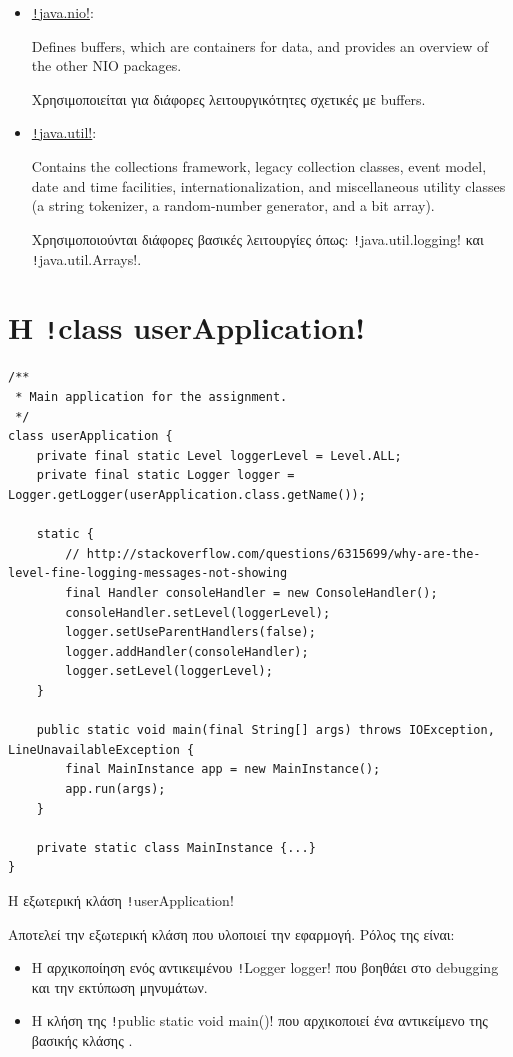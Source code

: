 \begin{itemize}
\item
\href{https://docs.oracle.com/javase/8/docs/api/java/nio/package-summary.html}{\texttt!java.nio!}:
\begin{displayquote}
Defines buffers, which are containers for data, and provides an overview of the other NIO packages.
\end{displayquote}
Χρησιμοποιείται για διάφορες λειτουργικότητες σχετικές με buffers.

\item
\href{https://docs.oracle.com/javase/8/docs/api/java/util/package-summary.html}{\texttt!java.util!}:
\begin{displayquote}
Contains the collections framework, legacy collection classes, event model, date and time facilities, internationalization, and miscellaneous utility classes (a string tokenizer, a random-number generator, and a bit array).
\end{displayquote}
\sloppy Χρησιμοποιούνται διάφορες βασικές λειτουργίες όπως:
\texttt!java.util.logging! και \texttt!java.util.Arrays!.
\end{itemize}

\section{Η \texttt!class userApplication!}
\begin{code}
\begin{verbatim}
/**
 * Main application for the assignment.
 */
class userApplication {
    private final static Level loggerLevel = Level.ALL;
    private final static Logger logger = Logger.getLogger(userApplication.class.getName());

    static {
        // http://stackoverflow.com/questions/6315699/why-are-the-level-fine-logging-messages-not-showing
        final Handler consoleHandler = new ConsoleHandler();
        consoleHandler.setLevel(loggerLevel);
        logger.setUseParentHandlers(false);
        logger.addHandler(consoleHandler);
        logger.setLevel(loggerLevel);
    }

    public static void main(final String[] args) throws IOException, LineUnavailableException {
        final MainInstance app = new MainInstance();
        app.run(args);
    }

    private static class MainInstance {...}
}
\end{verbatim}
\caption{Η εξωτερική κλάση \texttt!userApplication!}
\end{code}
Αποτελεί την εξωτερική κλάση που υλοποιεί την εφαρμογή.
Ρόλος της είναι:
\begin{itemize}
\item Η αρχικοποίηση ενός αντικειμένου \texttt!Logger logger! που βοηθάει στο debugging και την εκτύπωση μηνυμάτων.
\item Η κλήση της \texttt!public static void main()! που αρχικοποιεί ένα αντικείμενο της βασικής κλάσης .
\end{itemize}
